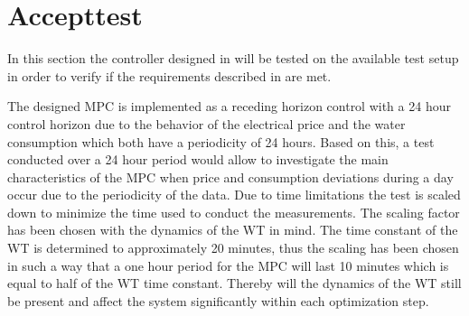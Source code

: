 \chapter{Accepttest}
\label{accepttest}

In this section the controller designed in  will be tested on the available test setup in order to verify if the requirements described in  are met. 

The designed MPC is implemented as a receding horizon control with a 24 hour control horizon due to the behavior of the electrical price and the water consumption which both have a periodicity of 24 hours. 
Based on this, a test conducted over a 24 hour period would allow to investigate the main characteristics of the MPC when price and consumption deviations during a day occur due to the periodicity of the data.   
Due to time limitations the test is scaled down to minimize the time used to conduct the measurements. 
The scaling factor has been chosen with the dynamics of the WT in mind. 
The time constant of the WT is determined to approximately 20 minutes, thus the scaling has been chosen in such a way that a one hour period for the MPC will last 10 minutes which is equal to half of the WT time constant. 
Thereby will the dynamics of the WT still be present and affect the system significantly within each optimization step.

